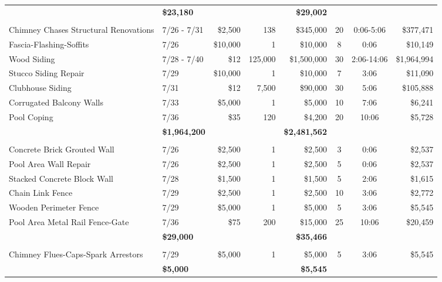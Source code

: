 \documentclass[11pt,letterpaper]{article}
\begin{document}
\begin{longtable}{p{4.2cm} p{1.6cm} r r r c c r}
\addlinespace[1pt] \multicolumn{4}{r}{} & \textbf{\$23,180} & & & \textbf{\$29,002} \\
\addlinespace[6pt]
\multicolumn{8}{l}{\textbf{Exterior Surfaces}} \\
\rowcolor{blue!12} Chimney Chases Structural Renovations & 7/26 - 7/31 & \$2,500 & 138 & \$345,000 & 20 & 0:06-5:06 & \$377,471 \\
Fascia-Flashing-Soffits & 7/26 & \$10,000 & 1 & \$10,000 & 8 & 0:06 & \$10,149 \\
\rowcolor{blue!12} Wood Siding & 7/28 - 7/40 & \$12 & 125,000 & \$1,500,000 & 30 & 2:06-14:06 & \$1,964,994 \\
Stucco Siding Repair & 7/29 & \$10,000 & 1 & \$10,000 & 7 & 3:06 & \$11,090 \\
\rowcolor{blue!12} Clubhouse Siding & 7/31 & \$12 & 7,500 & \$90,000 & 30 & 5:06 & \$105,888 \\
Corrugated Balcony Walls & 7/33 & \$5,000 & 1 & \$5,000 & 10 & 7:06 & \$6,241 \\
\rowcolor{blue!12} Pool Coping & 7/36 & \$35 & 120 & \$4,200 & 20 & 10:06 & \$5,728 \\
\addlinespace[1pt] \multicolumn{4}{r}{} & \textbf{\$1,964,200} & & & \textbf{\$2,481,562} \\
\addlinespace[6pt]
\multicolumn{8}{l}{\textbf{Fences-Walls-Gates}} \\
Concrete Brick Grouted Wall & 7/26 & \$2,500 & 1 & \$2,500 & 3 & 0:06 & \$2,537 \\
\rowcolor{blue!12} Pool Area Wall Repair & 7/26 & \$2,500 & 1 & \$2,500 & 5 & 0:06 & \$2,537 \\
Stacked Concrete Block Wall & 7/28 & \$1,500 & 1 & \$1,500 & 5 & 2:06 & \$1,615 \\
\rowcolor{blue!12} Chain Link Fence & 7/29 & \$2,500 & 1 & \$2,500 & 10 & 3:06 & \$2,772 \\
Wooden Perimeter Fence & 7/29 & \$5,000 & 1 & \$5,000 & 5 & 3:06 & \$5,545 \\
\rowcolor{blue!12} Pool Area Metal Rail Fence-Gate & 7/36 & \$75 & 200 & \$15,000 & 25 & 10:06 & \$20,459 \\
\addlinespace[1pt] \multicolumn{4}{r}{} & \textbf{\$29,000} & & & \textbf{\$35,466} \\
\addlinespace[6pt]
\multicolumn{8}{l}{\textbf{Fire Safety}} \\
Chimney Flues-Caps-Spark Arrestors & 7/29 & \$5,000 & 1 & \$5,000 & 5 & 3:06 & \$5,545 \\
\addlinespace[1pt] \multicolumn{4}{r}{} & \textbf{\$5,000} & & & \textbf{\$5,545} \\

\end{longtable}
\end{document}
